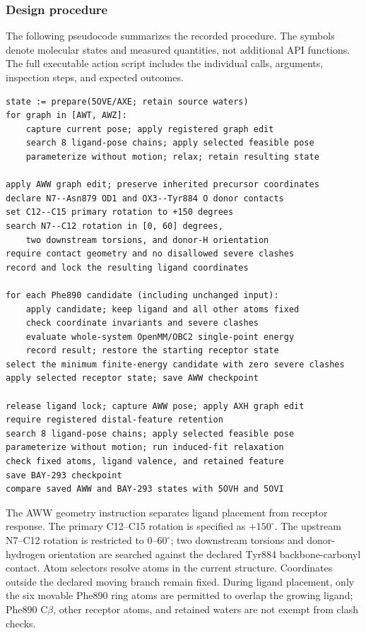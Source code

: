 \subsubsection{Design procedure}

The following pseudocode summarizes the recorded procedure. The symbols denote molecular states and measured quantities, not additional API functions. The full executable action script includes the individual calls, arguments, inspection steps, and expected outcomes.

\noindent\begin{minipage}{\linewidth}
\begin{lstlisting}[language={},caption={SOS1 design protocol (pseudocode).},label={lst:sos1protocol}]
state := prepare(5OVE/AXE; retain source waters)
for graph in [AWT, AWZ]:
    capture current pose; apply registered graph edit
    search 8 ligand-pose chains; apply selected feasible pose
    parameterize without motion; relax; retain resulting state

apply AWW graph edit; preserve inherited precursor coordinates
declare N7--Asn879 OD1 and OX3--Tyr884 O donor contacts
set C12--C15 primary rotation to +150 degrees
search N7--C12 rotation in [0, 60] degrees,
    two downstream torsions, and donor-H orientation
require contact geometry and no disallowed severe clashes
record and lock the resulting ligand coordinates

for each Phe890 candidate (including unchanged input):
    apply candidate; keep ligand and all other atoms fixed
    check coordinate invariants and severe clashes
    evaluate whole-system OpenMM/OBC2 single-point energy
    record result; restore the starting receptor state
select the minimum finite-energy candidate with zero severe clashes
apply selected receptor state; save AWW checkpoint

release ligand lock; capture AWW pose; apply AXH graph edit
require registered distal-feature retention
search 8 ligand-pose chains; apply selected feasible pose
parameterize without motion; run induced-fit relaxation
check fixed atoms, ligand valence, and retained feature
save BAY-293 checkpoint
compare saved AWW and BAY-293 states with 5OVH and 5OVI
\end{lstlisting}
\end{minipage}\par\medskip

The AWW geometry instruction separates ligand placement from receptor response. The primary C12--C15 rotation is specified as $+150^{\circ}$. The upstream N7--C12 rotation is restricted to $0$--$60^{\circ}$; two downstream torsions and donor-hydrogen orientation are searched against the declared Tyr884 backbone-carbonyl contact. Atom selectors resolve atoms in the current structure. Coordinates outside the declared moving branch remain fixed. During ligand placement, only the six movable Phe890 ring atoms are permitted to overlap the growing ligand; Phe890 C$\beta$, other receptor atoms, and retained waters are not exempt from clash checks.

